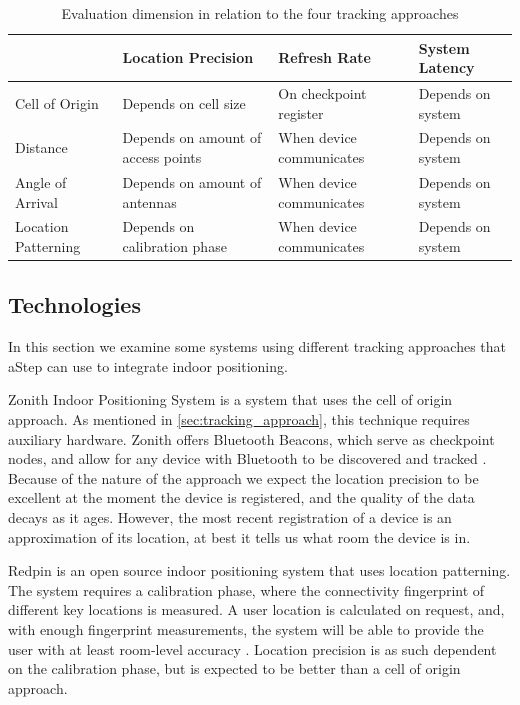\begin{table}[]
\centering
\begin{tabular}{|l|p{4cm}|p{4cm}|p{3.5cm}|}
\hline
                    & Location Precision                 & Refresh Rate             & System Latency    \\ \hline
Cell of Origin      & Depends on cell size				 & On checkpoint register   & Depends on system \\ \hline
Distance            & Depends on amount of access points & When device communicates & Depends on system \\ \hline
Angle of Arrival    & Depends on amount of antennas      & When device communicates & Depends on system \\ \hline
Location Patterning & Depends on calibration phase       & When device communicates & Depends on system \\ \hline
\end{tabular}
\caption{Evaluation dimension in relation to the four tracking approaches}
\label{tab:evaluating_approaches}
\end{table}


\subsection{Technologies}
In this section we examine some systems using different tracking approaches that aStep can use to integrate indoor positioning.

Zonith Indoor Positioning System is a system that uses the cell of origin approach. As mentioned in \cref{sec:tracking_approach}, this technique requires auxiliary hardware. Zonith offers Bluetooth Beacons, which serve as checkpoint nodes, and allow for any device with Bluetooth to be discovered and tracked \cite{zonith}. Because of the nature of the approach we expect the location precision to be excellent at the moment the device is registered, and the quality of the data decays as it ages. However, the most recent registration of a device is an approximation of its location, at best it tells us what room the device is in.

Redpin is an open source indoor positioning system that uses location patterning. The system requires a calibration phase, where the connectivity fingerprint of different key locations is measured. A user location is calculated on request, and, with enough fingerprint measurements, the system will be able to provide the user with at least room-level accuracy \cite{redpin}. Location precision is as such dependent on the calibration phase, but is expected to be better than a cell of origin approach. 

